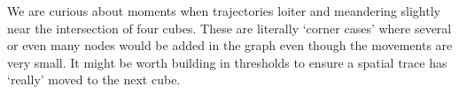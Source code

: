 We are curious about moments when trajectories loiter and meandering slightly near the intersection of four cubes.
These are literally `corner cases' where several or even many nodes would be added in the graph even though the movements are very small.
It might be worth building in thresholds to ensure a spatial trace has `really' moved to the next cube.



